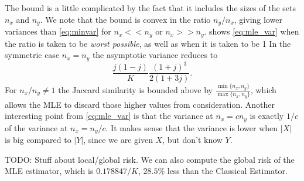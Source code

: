 The bound is a little complicated by the fact that it includes the sizes of the sets $n_x$ and $n_y$.
We note that the bound is convex in the ratio $n_y/n_x$, giving lower variances than \cref{eq:minvar} for $n_x<\!<n_y$ or $n_x >\!> n_y$.
 shows \cref{eq:mle_var} when the ratio is taken to be \emph{worst possible}, as well as when it is taken to be 1
In the symmetric case $n_x=n_y$ the asymptotic variance reduces to
\[
   \frac{j(1-j)}{K}\frac{(1+j)^3}{2(1+3j)}.
\]
For $n_x/n_y\neq1$ the Jaccard similarity is bounded above by $\frac{\min\{n_x,n_y\}}{\max\{n_x,n_y\}}$, which allows the MLE to discard those higher values from consideration.
Another interesting point from \cref{eq:mle_var} is that the variance at $n_x=c n_y$ is exactly $1/c$ of the variance at $n_x=n_y/c$.
It makes sense that the variance is lower when $|X|$ is big compared to $|Y|$, since we are given $X$, but don't know $Y$.

TODO: Stuff about local/global risk.
We can also compute the global risk of the MLE estimator, which is $0.178847/K$, $28.5\%$ less than the Classical Estimator.

